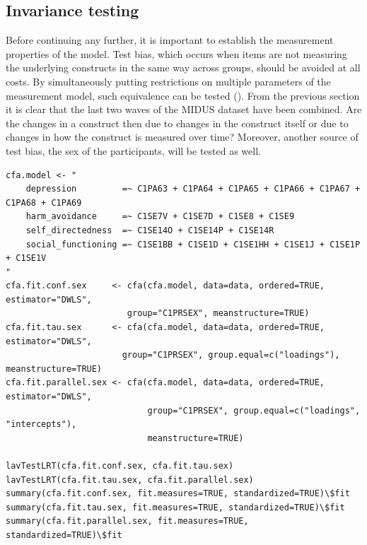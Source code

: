\documentclass[11pt]{article}
\begin{document}
\FloatBarrier\subsection{Invariance testing}


Before continuing any further, it is important to establish the measurement
properties of the model. Test bias, which occurs when items are not measuring
the underlying constructs in the same way across groups, should be avoided at
all costs. By simultaneously putting restrictions on multiple parameters of the
measurement model, such equivalence can be tested (\cite{brown2015}). From the
previous section it is clear that the last two waves of the MIDUS dataset have
been combined. Are the changes in a construct then due to changes in the
construct itself or due to changes in how the construct is measured over time?
Moreover, another source of test bias, the sex of the participants, will be
tested as well.

\begin{minipage}{\linewidth}
\begin{lstlisting}
cfa.model <- "
    depression         =~ C1PA63 + C1PA64 + C1PA65 + C1PA66 + C1PA67 + C1PA68 + C1PA69
    harm_avoidance     =~ C1SE7V + C1SE7D + C1SE8 + C1SE9
    self_directedness  =~ C1SE14O + C1SE14P + C1SE14R
    social_functioning =~ C1SE1BB + C1SE1D + C1SE1HH + C1SE1J + C1SE1P + C1SE1V
"
cfa.fit.conf.sex     <- cfa(cfa.model, data=data, ordered=TRUE, estimator="DWLS",
                        group="C1PRSEX", meanstructure=TRUE)
cfa.fit.tau.sex      <- cfa(cfa.model, data=data, ordered=TRUE, estimator="DWLS",
                       group="C1PRSEX", group.equal=c("loadings"), meanstructure=TRUE)
cfa.fit.parallel.sex <- cfa(cfa.model, data=data, ordered=TRUE, estimator="DWLS",
                            group="C1PRSEX", group.equal=c("loadings", "intercepts"),
                            meanstructure=TRUE)

lavTestLRT(cfa.fit.conf.sex, cfa.fit.tau.sex)
lavTestLRT(cfa.fit.tau.sex, cfa.fit.parallel.sex)
summary(cfa.fit.conf.sex, fit.measures=TRUE, standardized=TRUE)\$fit
summary(cfa.fit.tau.sex, fit.measures=TRUE, standardized=TRUE)\$fit
summary(cfa.fit.parallel.sex, fit.measures=TRUE, standardized=TRUE)\$fit
\end{lstlisting}
\end{minipage}
\end{document}
